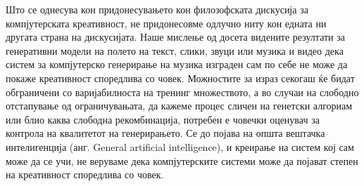 Што се однесува кон придонесувањето кон филозофската дискусија за компјутерската креативност, не придонесовме одлучно ниту кон едната ни другата страна на дискусијата. Наше мислење од досета видените резултати за генеративни модели на полето на текст, слики, звуци или музика и видео дека систем за компјутерско генерирање на музика изграден сам по себе не може да покаже креативност споредлива со човек. Можностите за израз секогаш ќе бидат обграничени со варијабилноста на тренинг множеството, а во случаи на слободно отстапување од ограничувањата, да кажеме процес сличен на генетски алгориам или блио каква слободна рекомбинација, потребен е човечки оценувач за контрола на квалитетот на генерирањето. Се до појава на општа вештачка интелигенција (анг. General artificial intelligence), и креирање на систем кој сам може да се учи, не веруваме дека компјутерските системи може да појават степен на креативност споредлива со човек.

